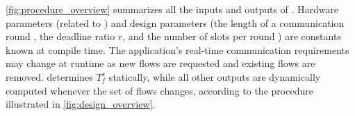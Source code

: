 \squarepar{%
  Flow requests and acknowledgments are sent via dedicated control flows, which are registered by default at bootstrapping for each node in the network.%
}



\cref{fig:procedure_overview} summarizes all the inputs and outputs of \DRP.
Hardware parameters (related to \bolt) and design parameters (\ie the length of a communication round \rlength, the deadline ratio $r$, and the number of slots per round \nslotsmax) are constants known at compile time.
The application's real-time communication requirements may change at runtime as new flows are requested and existing flows are removed. \DRP determines $T_f^s$ statically, while all other outputs are dynamically computed whenever the set of flows changes, according to the procedure illustrated in \cref{fig:design_overview}.
